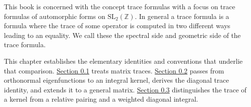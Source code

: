 This book is concerned with the concept trace formulas with a focus on trace formulas of automorphic forms on $\textrm{SL}_2(\mathbb{Z})$. In general a trace formula is a formula where the trace of some operator is computed in two different ways leading to an equality. We call these the spectral side and geometric side of the trace formula. 

This chapter establishes the elementary identities and conventions that underlie that comparison. \hyperref[v1a-ch00-s1]{Section 0.1} treats matrix traces. \hyperref[v1a-ch00-s2]{Section 0.2} passes from orthonormal eigenfunctions to an integral kernel, derives the diagonal trace identity, and extends it to a general matrix. \hyperref[v1a-ch00-s5]{Section 0.3} distinguishes the trace of a kernel from a relative pairing and a weighted diagonal integral.
